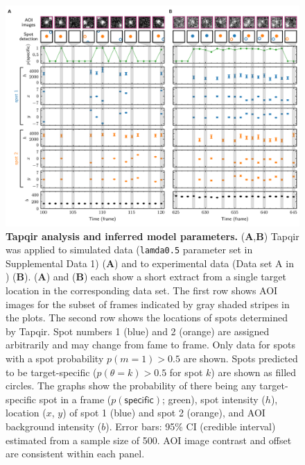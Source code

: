 \begin{figure}
\begin{fullwidth}
\includegraphics[width=183mm]{figures/tapqir_analysis.png}
\caption{\textbf{Tapqir analysis and inferred model parameters.} (\textbf{A},\textbf{B}) Tapqir was applied to simulated data (\texttt{lamda0.5} parameter set in Supplemental Data 1) (\textbf{A}) and to experimental data (Data set A in ) (\textbf{B}). (\textbf{A}) and (\textbf{B}) each show a short extract from a single target location in the corresponding data set. The first row shows AOI images for the subset of frames indicated by gray shaded stripes in the plots. The second row shows the locations of spots determined by Tapqir. Spot numbers 1 (blue) and 2 (orange) are assigned arbitrarily and may change from fame to frame. Only data for spots with a spot probability $p(m=1) > 0.5$ are shown. Spots predicted to be target-specific ($p(\theta=k)>0.5$ for spot $k$) are shown as filled circles. The graphs show the probability of there being any target-specific spot in a frame ($p(\mathsf{specific})$; green), spot intensity ($h$), location ($x$, $y$) of spot 1 (blue) and spot 2 (orange), and AOI background intensity ($b$). Error bars: 95\% CI (credible interval) estimated from a sample size of 500. AOI image contrast and offset are consistent within each panel.}
\label{fig:tapqir_analysis}


\end{fullwidth}
\end{figure}
